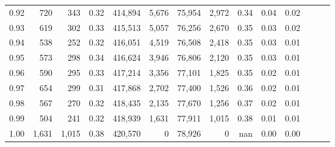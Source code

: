 \begin{tabular}{rrrrrrrrrrrrrr}
0.92 &    720 &    343 &  0.32 &  414,894 &    5,676 &  75,954 &   2,972 &  0.34 &  0.04 &      0.02 \\
0.93 &    619 &    302 &  0.33 &  415,513 &    5,057 &  76,256 &   2,670 &  0.35 &  0.03 &      0.02 \\
0.94 &    538 &    252 &  0.32 &  416,051 &    4,519 &  76,508 &   2,418 &  0.35 &  0.03 &      0.01 \\
0.95 &    573 &    298 &  0.34 &  416,624 &    3,946 &  76,806 &   2,120 &  0.35 &  0.03 &      0.01 \\
0.96 &    590 &    295 &  0.33 &  417,214 &    3,356 &  77,101 &   1,825 &  0.35 &  0.02 &      0.01 \\
0.97 &    654 &    299 &  0.31 &  417,868 &    2,702 &  77,400 &   1,526 &  0.36 &  0.02 &      0.01 \\
0.98 &    567 &    270 &  0.32 &  418,435 &    2,135 &  77,670 &   1,256 &  0.37 &  0.02 &      0.01 \\
0.99 &    504 &    241 &  0.32 &  418,939 &    1,631 &  77,911 &   1,015 &  0.38 &  0.01 &      0.01 \\
1.00 &  1,631 &  1,015 &  0.38 &  420,570 &        0 &  78,926 &       0 &   nan &  0.00 &      0.00 \\
\bottomrule
\end{tabular}

